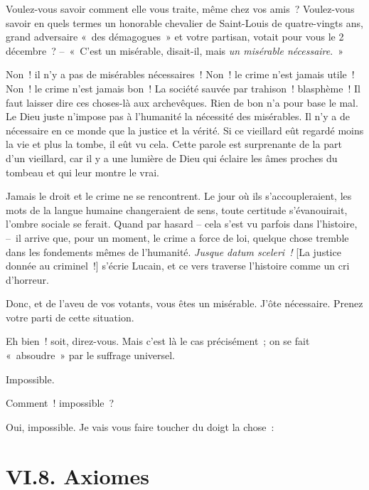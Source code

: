 \documentclass[french,twoside]{book} %
\begin{document}
Voulez-vous savoir comment elle vous traite, même chez vos amis ? Voulez-vous savoir en quels termes un honorable chevalier de Saint-Louis de quatre-vingts ans, grand adversaire « des démagogues » et votre partisan, votait pour vous le 2 décembre ? – « C’est un misérable, disait-il, mais \emph{un misérable nécessaire}. »\par
Non ! il n’y a pas de misérables nécessaires ! Non ! le crime n’est jamais utile ! Non ! le crime n’est jamais bon ! La société sauvée par trahison ! blasphème ! Il faut laisser dire ces choses-là aux archevêques. Rien de bon n’a pour base le mal. Le Dieu juste n’impose pas à l’humanité la nécessité des misérables. Il n’y a de nécessaire en ce monde que la justice et la vérité. Si ce vieillard eût regardé moins la vie et plus la tombe, il eût vu cela. Cette parole est surprenante de la part d’un vieillard, car il y a une lumière de Dieu qui éclaire les âmes proches du tombeau et qui leur montre le vrai.\par
Jamais le droit et le crime ne se rencontrent. Le jour où ils s’accoupleraient, les mots de la langue humaine changeraient de sens, toute certitude s’évanouirait, l’ombre sociale se ferait. Quand par hasard – cela s’est vu parfois dans l’histoire, – il arrive que, pour un moment, le crime a force de loi, quelque chose tremble dans les fondements mêmes de l’humanité. \emph{Jusque datum sceleri !} [La justice donnée au criminel !] s’écrie Lucain, et ce vers traverse l’histoire comme un cri d’horreur.\par
Donc, et de l’aveu de vos votants, vous êtes un misérable. J’ôte nécessaire. Prenez votre parti de cette situation.\par
Eh bien ! soit, direz-vous. Mais c’est là le cas précisément ; on se fait « absoudre » par le suffrage universel.\par
Impossible.\par
Comment ! impossible ?\par
Oui, impossible. Je vais vous faire toucher du doigt la chose :

\section[{VI.8. Axiomes}]{VI.8. Axiomes}
\end{document}

